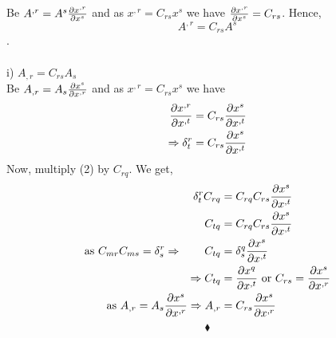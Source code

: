  Be $ A^{,r} = A^{s}\pdv{x^{,r}}{x^s}$ and as $x^{,r} = C_{rs}x^{s}$  we have $\pdv{x^{,r}}{x^s} = C_{rs}$. Hence,$$ A^{,r} = C_{rs}A^{s}$$.\\\\
 i) $ A_{,r} = C_{rs}A_{s}$\\
 Be $ A_{,r} = A_{s}\pdv{x^{s}}{x^{,r}}$ and as $x^{,r} = C_{rs}x^{s}$  we have
\begin{align}
\pdv{x^{,r}}{x^{,t}} &= C_{rs}\pdv{x^{s}}{x^{,t}}\\
\Rightarrow \delta^{r}_{t} &= C_{rs}\pdv{x^{s}}{x^{,t}}
  \end{align}
  Now, multiply (2) by $C_{rq}$. We get,
  \begin{align}
 \delta^{r}_{t}C_{rq} &= C_{rq}C_{rs}\pdv{x^{s}}{x^{,t}}\\
 \ C_{tq} &= C_{rq}C_{rs}\pdv{x^{s}}{x^{,t}}\\
 \text{as }C_{mr}C_{ms} = \delta^r_s \Rightarrow \quad \quad  C_{tq} &= \delta^q_s\pdv{x^{s}}{x^{,t}}\\
 \Rightarrow   C_{tq} &= \pdv{x^{q}}{x^{,t}} \text{  or  }  C_{rs} = \pdv{x^{s}}{x^{,r}}\\
 \text{  as  } A_{,r} = A_{s}\pdv{x^{s}}{x^{,r}} \Rightarrow A_{,r} &= C_{rs}\pdv{x^{s}}{x^{,r}}
  \end{align}
$$\blacklozenge$$
\pagebreak[4]


